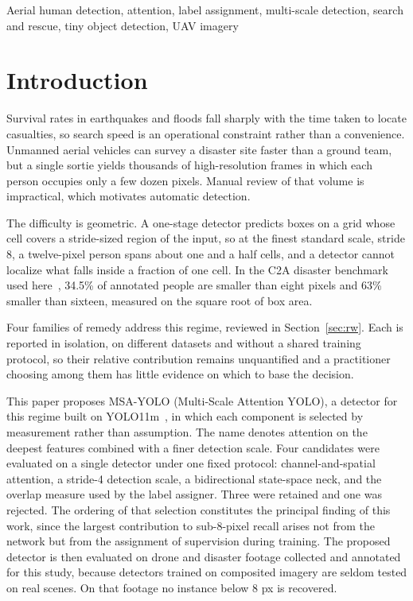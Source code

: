 \documentclass[conference,a4paper]{IEEEtran}
\begin{document}
\begin{IEEEkeywords}
Aerial human detection, attention, label assignment, multi-scale detection,
search and rescue, tiny object detection, UAV imagery
\end{IEEEkeywords}

\section{Introduction}
Survival rates in earthquakes and floods fall sharply with the time taken to
locate casualties, so search speed is an operational constraint rather than a
convenience. Unmanned aerial vehicles can survey a disaster site faster than a
ground team, but a single sortie yields thousands of high-resolution frames in
which each person occupies only a few dozen pixels. Manual review of that volume
is impractical, which motivates automatic detection.

The difficulty is geometric. A one-stage detector predicts boxes on a grid whose
cell covers a stride-sized region of the input, so at the finest standard scale,
stride 8, a twelve-pixel person spans about one and a half cells, and a detector
cannot localize what falls inside a fraction of one cell.
In the C2A disaster benchmark used here~\cite{nihal2024c2a}, 34.5\% of
annotated people are smaller than eight pixels and 63\% smaller than sixteen,
measured on the square root of box area.

Four families of remedy address this regime, reviewed in Section~\ref{sec:rw}.
Each is reported in isolation, on different datasets and without a shared
training protocol, so their relative contribution remains unquantified and a
practitioner choosing among them has little evidence on which to base the
decision.

This paper proposes MSA-YOLO (Multi-Scale Attention YOLO), a detector for this
regime built on YOLO11m~\cite{jocher2024yolo11}, in which each component is
selected by measurement rather than assumption. The name denotes attention on the
deepest features combined with a finer detection scale. Four candidates were evaluated on a single
detector under one fixed protocol: channel-and-spatial attention, a stride-4
detection scale, a bidirectional state-space neck, and the overlap measure used
by the label assigner. Three were retained and one was rejected. The ordering of
that selection constitutes the principal finding of this work, since the largest
contribution to sub-8-pixel recall arises not from the network but from the
assignment of supervision during training. The proposed detector is then
evaluated on drone and disaster footage collected and annotated for this study,
because detectors trained on composited imagery are seldom tested on real
scenes. On that footage no instance below 8 px is recovered.
\end{document}
